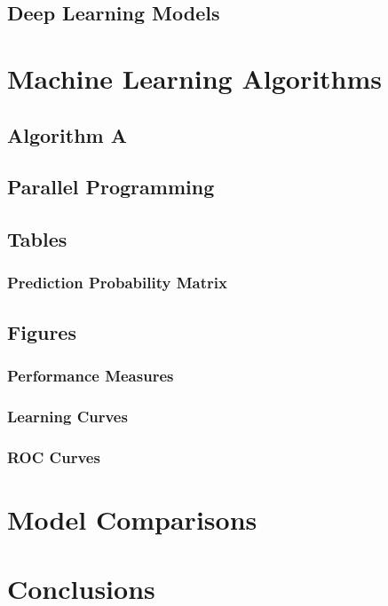 \subsection{Deep Learning Models}

\section{Machine Learning Algorithms}

\subsection{Algorithm A}

\subsection{Parallel Programming}

\subsection{Tables}

\subsubsection{Prediction Probability Matrix}

\subsection{Figures}

\subsubsection{Performance Measures}

\subsubsection{Learning Curves}

\subsubsection{ROC Curves}

\section{Model Comparisons}

\section{Conclusions}



